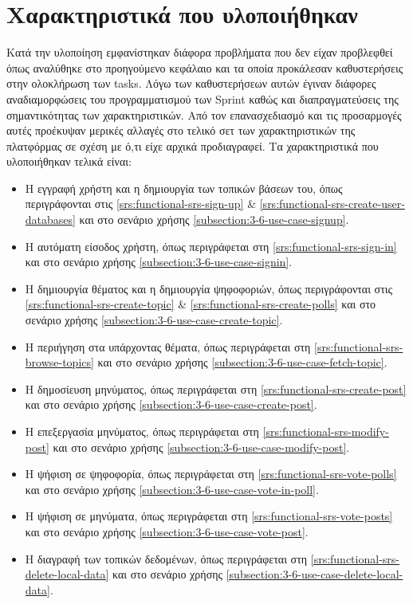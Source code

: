 \section{Χαρακτηριστικά που υλοποιήθηκαν} \label{section:4-5-implemented-parts}

Κατά την υλοποίηση εμφανίστηκαν διάφορα προβλήματα που δεν είχαν προβλεφθεί όπως αναλύθηκε στο προηγούμενο κεφάλαιο και τα οποία προκάλεσαν καθυστερήσεις στην ολοκλήρωση των tasks. Λόγω των καθυστερήσεων αυτών έγιναν διάφορες αναδιαμορφώσεις του προγραμματισμού των Sprint καθώς και διαπραγματεύσεις της σημαντικότητας των χαρακτηριστικών. Από τον επανασχεδιασμό και τις προσαρμογές αυτές προέκυψαν μερικές αλλαγές στο τελικό σετ των χαρακτηριστικών της πλατφόρμας σε σχέση με ό,τι είχε αρχικά προδιαγραφεί. Τα χαρακτηριστικά που υλοποιήθηκαν τελικά είναι:

\begin{itemize}
    \item Η εγγραφή χρήστη και η δημιουργία των τοπικών βάσεων του, όπως περιγράφονται στις \ref{srs:functional-srs-sign-up} \& \ref{srs:functional-srs-create-user-databases} και στο σενάριο χρήσης \ref{subsection:3-6-use-case-signup}.
    \item Η αυτόματη είσοδος χρήστη, όπως περιγράφεται στη \ref{srs:functional-srs-sign-in} και στο σενάριο χρήσης \ref{subsection:3-6-use-case-signin}.
    \item Η δημιουργία θέματος και η δημιουργία ψηφοφοριών, όπως περιγράφονται στις \ref{srs:functional-srs-create-topic} \& \ref{srs:functional-srs-create-polls} και στο σενάριο χρήσης \ref{subsection:3-6-use-case-create-topic}.
    \item Η περιήγηση στα υπάρχοντας θέματα, όπως περιγράφεται στη \ref{srs:functional-srs-browse-topics} και στο σενάριο χρήσης \ref{subsection:3-6-use-case-fetch-topic}.
    \item Η δημοσίευση μηνύματος, όπως περιγράφεται στη \ref{srs:functional-srs-create-post} και στο σενάριο χρήσης \ref{subsection:3-6-use-case-create-post}.
    \item Η επεξεργασία μηνύματος, όπως περιγράφεται στη \ref{srs:functional-srs-modify-post} και στο σενάριο χρήσης \ref{subsection:3-6-use-case-modify-post}.
    \item Η ψήφιση σε ψηφοφορία, όπως περιγράφεται στη \ref{srs:functional-srs-vote-polls} και στο σενάριο χρήσης \ref{subsection:3-6-use-case-vote-in-poll}.
    \item Η ψήφιση σε μηνύματα, όπως περιγράφεται στη \ref{srs:functional-srs-vote-posts} και στο σενάριο χρήσης \ref{subsection:3-6-use-case-vote-post}.
    \item Η διαγραφή των τοπικών δεδομένων, όπως περιγράφεται στη \ref{srs:functional-srs-delete-local-data} και στο σενάριο χρήσης \ref{subsection:3-6-use-case-delete-local-data}.
\end{itemize}


